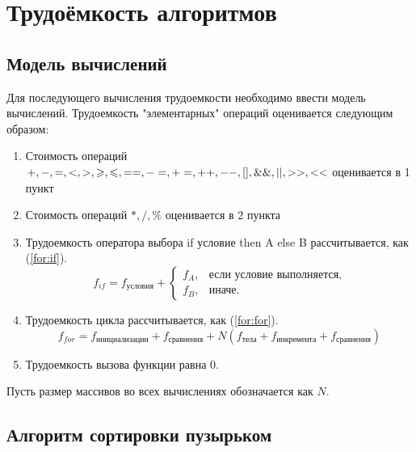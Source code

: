 \clearpage
\section{Трудоёмкость алгоритмов}

\subsection{Модель вычислений}

Для последующего вычисления трудоемкости необходимо ввести модель вычислений. Трудоемкость "элементарных" операций оценивается следующим образом:

\begin{enumerate}
	\item Стоимость операций $+,-,=,<,>,\geq, \leq, ==, -=, +=, ++, --, [\space], \&\&, ||, >>, <<$ оценивается в 1 пункт
    \item Стоимость операций $*, /, \% $ оценивается в 2 пункта

	\item Трудоемкость оператора выбора if условие then A else B рассчитывается, как (\ref{for:if}).
	\begin{equation}
	\label{for:if}
	f_{if} = f_{\text{условия}} +
	\begin{cases}
	f_A, & \text{если условие выполняется,}\\
	f_B, & \text{иначе.}
	\end{cases}
	\end{equation}
	\item Трудоемкость цикла рассчитывается, как (\ref{for:for}).
	\begin{equation}
	\label{for:for}
	f_{for} = f_{\text{инициализации}} + f_{\text{сравнения}} + N(f_{\text{тела}} + f_{\text{инкремента}} + f_{\text{сравнения}})
	\end{equation}
	\item Трудоемкость вызова функции равна 0.
\end{enumerate}

Пусть размер массивов во всех вычислениях обозначается как $N$.

\subsection{Алгоритм сортировки пузырьком}

